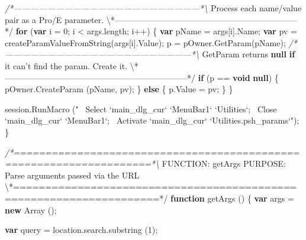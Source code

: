 \documentclass[]{article}
\newenvironment{Shaded}{}{}
\newcommand{\KeywordTok}[1]{\textcolor[rgb]{0.00,0.44,0.13}{\textbf{{#1}}}}
\newcommand{\DecValTok}[1]{\textcolor[rgb]{0.25,0.63,0.44}{{#1}}}
\newcommand{\StringTok}[1]{\textcolor[rgb]{0.25,0.44,0.63}{{#1}}}
\newcommand{\CommentTok}[1]{\textcolor[rgb]{0.38,0.63,0.69}{\textit{{#1}}}}
\newcommand{\OtherTok}[1]{\textcolor[rgb]{0.00,0.44,0.13}{{#1}}}
\newcommand{\FunctionTok}[1]{\textcolor[rgb]{0.02,0.16,0.49}{{#1}}}
\newcommand{\NormalTok}[1]{{#1}}
\begin{document}
\begin{Shaded}
\begin{Highlighting}[]
\CommentTok{/*------------------------------------------------------------------*\textbackslash{}}
  \NormalTok{Process each name/value pair as a Pro/E }\OtherTok{parameter}\NormalTok{.}
\NormalTok{\textbackslash{}*------------------------------------------------------------------*}\OtherTok{/}
  \KeywordTok{for} \NormalTok{(}\KeywordTok{var} \NormalTok{i = }\DecValTok{0}\NormalTok{; i < }\OtherTok{args}\NormalTok{.}\FunctionTok{length}\NormalTok{; i++)}
    \NormalTok{\{}
      \KeywordTok{var} \NormalTok{pName = args[i].}\FunctionTok{Name}\NormalTok{;}
      \KeywordTok{var} \NormalTok{pv = }\FunctionTok{createParamValueFromString}\NormalTok{(args[i].}\FunctionTok{Value}\NormalTok{);}
      \NormalTok{p = }\OtherTok{pOwner}\NormalTok{.}\FunctionTok{GetParam}\NormalTok{(pName);}
\CommentTok{/*------------------------------------------------------------------*\textbackslash{}}
  \NormalTok{GetParam returns }\KeywordTok{null} \KeywordTok{if} \NormalTok{it can}\StringTok{'t find the param.  Create it.}
\NormalTok{\textbackslash{}*------------------------------------------------------------------*}\OtherTok{/}
      \KeywordTok{if} \NormalTok{(p == }\KeywordTok{void} \KeywordTok{null}\NormalTok{) }
    \NormalTok{\{}
      \OtherTok{pOwner}\NormalTok{.}\FunctionTok{CreateParam} \NormalTok{(pName, pv);}
    \NormalTok{\}}
      \KeywordTok{else}
    \NormalTok{\{}
      \OtherTok{p}\NormalTok{.}\FunctionTok{Value} \NormalTok{= pv;}
    \NormalTok{\}}
    \NormalTok{\}}
  
  \OtherTok{session}\NormalTok{.}\FunctionTok{RunMacro} \NormalTok{(}\StringTok{"~ Select `main_dlg_cur` `MenuBar1` `Utilities`;~ Close `main_dlg_cur` `MenuBar1`;~ Activate `main_dlg_cur` `Utilities.psh_params`"}\NormalTok{);}
\NormalTok{\}}

\CommentTok{/*====================================================================*\textbackslash{}}
\NormalTok{FUNCTION: getArgs}
\NormalTok{PURPOSE:  Parse arguments passed via the URL}
\NormalTok{\textbackslash{}*====================================================================*}\OtherTok{/}
\KeywordTok{function} \FunctionTok{getArgs} \NormalTok{()}
\NormalTok{\{}
  \KeywordTok{var} \NormalTok{args = }\KeywordTok{new} \FunctionTok{Array} \NormalTok{();}
  
  \KeywordTok{var} \NormalTok{query = }\OtherTok{location}\NormalTok{.}\OtherTok{search}\NormalTok{.}\FunctionTok{substring} \NormalTok{(}\DecValTok{1}\NormalTok{);}
  

\end{Highlighting}
\end{Shaded}
\end{document}
